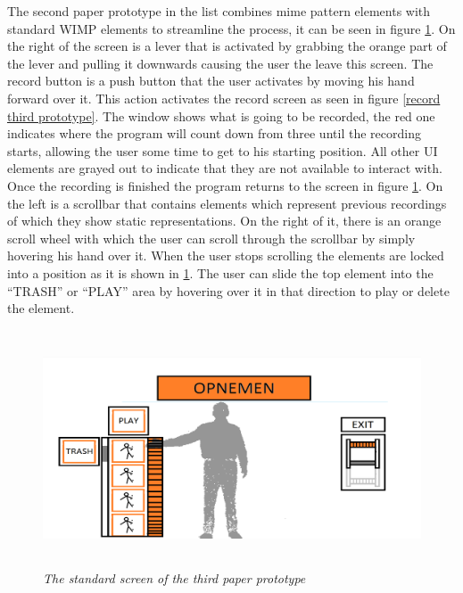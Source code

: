 The second paper prototype in the list combines mime pattern elements with standard WIMP elements to streamline the process, it can be seen in figure \ref{standard third prototype}. On the right of the screen is a lever that is activated by grabbing the orange part of the lever and pulling it downwards causing the user the leave this screen. The record button is a push button that the user activates by moving his hand forward over it. This action activates the record screen as seen in figure \ref{record third prototype}. The window shows what is going to be recorded, the red one indicates where the program will count down from three until the recording starts, allowing the user some time to get to his starting position. All other UI elements are grayed out to indicate that they are not available to interact with. Once the recording is finished the program returns to the screen in figure \ref{standard third prototype}. On the left is a scrollbar that contains elements which represent previous recordings of which they show static representations. On the right of it, there is an orange scroll wheel with which the user can scroll through the scrollbar by simply hovering his hand over it. When the user stops scrolling the elements are locked into a position as it is shown in \ref{standard third prototype}. The user can slide the top element into the ``TRASH'' or ``PLAY'' area by hovering over it in that direction to play or delete the element.\\

\begin{figure}[H]
	\begin{center}
		\includegraphics[width=12.5cm, height=7cm]{figures/prototype_5_3_standard.png}
		\caption{\emph{The standard screen of the third paper prototype}}
		\label{standard third prototype}
	\end{center}
\end{figure}

